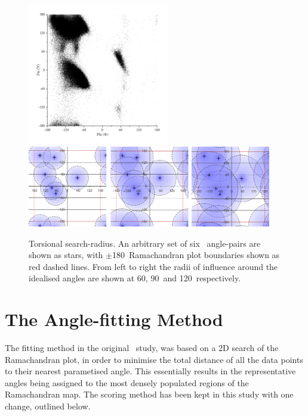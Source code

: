 \begin{figure}[hbtp]
\begin{center}
\includegraphics[width=0.55\textwidth]{05-ReducedRep/ram_plot/NotGlyOrPro_All_B_Scatter.png}
\includegraphics[width=0.95\textwidth]{05-ReducedRep/search/radius.png}
\caption[Torsional Search Radius]{%
Torsional search-radius.
An arbitrary set of six \raft\ angle-pairs are shown as stars, with $\pm$180\degree\ Ramachandran plot boundaries shown as red dashed lines. From left to right the radii of influence around the idealised angles are shown at 60\degree, 90\degree\ and 120\degree\ respectively.}
\label{fig:reducedrep:searchradius}
\end{center}
\end{figure}


\section{The Angle-fitting Method}

The fitting method in the original \raft\ study, was based on a 2D search of the Ramachandran plot, in order to minimise the total distance of all the data points to their nearest parametised angle. This essentially results in the representative angles being assigned to the most densely populated regions of the Ramachandran map. The scoring method has been kept in this study with one change, outlined below.

